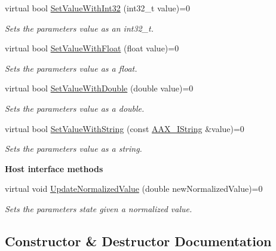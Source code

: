\begin{Indent}
\begin{DoxyCompactItemize}
virtual bool \mbox{\hyperlink{a01857_aa2b8cfdd30ff25e47c4c2a8609d1e06f}{Set\+Value\+With\+Int32}} (int32\+\_\+t value)=0
\begin{DoxyCompactList}\small\item\em Sets the parameter\textquotesingle{}s value as an int32\+\_\+t. \end{DoxyCompactList}\item 
virtual bool \mbox{\hyperlink{a01857_a1d37b80bc3a9c4e53fc2c1684f47dfb7}{Set\+Value\+With\+Float}} (float value)=0
\begin{DoxyCompactList}\small\item\em Sets the parameter\textquotesingle{}s value as a float. \end{DoxyCompactList}\item 
virtual bool \mbox{\hyperlink{a01857_a95e2d31931b586f43e42d41f2dce7c6d}{Set\+Value\+With\+Double}} (double value)=0
\begin{DoxyCompactList}\small\item\em Sets the parameter\textquotesingle{}s value as a double. \end{DoxyCompactList}\item 
virtual bool \mbox{\hyperlink{a01857_a0f1ecef3d86f0ea1fef4255a9294d1df}{Set\+Value\+With\+String}} (const \mbox{\hyperlink{a01873}{A\+A\+X\+\_\+\+I\+String}} \&value)=0
\begin{DoxyCompactList}\small\item\em Sets the parameter\textquotesingle{}s value as a string. \end{DoxyCompactList}\end{DoxyCompactItemize}
\end{Indent}
\begin{Indent}\textbf{ Host interface methods}\par
\begin{DoxyCompactItemize}
\item 
virtual void \mbox{\hyperlink{a01857_a408918950ea63aa0e85b90e588856624}{Update\+Normalized\+Value}} (double new\+Normalized\+Value)=0
\begin{DoxyCompactList}\small\item\em Sets the parameter\textquotesingle{}s state given a normalized value. \end{DoxyCompactList}\end{DoxyCompactItemize}
\end{Indent}


\subsection{Constructor \& Destructor Documentation}
\mbox{\label{a01857_a69062a223819c3467ea308c816b28c6b}} 
